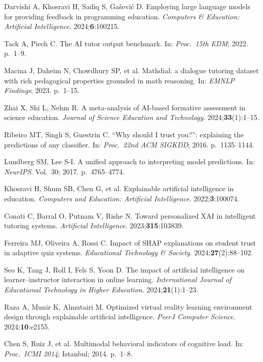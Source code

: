 \documentclass[ASNA,twocolumn]{USG} %
\begin{document}
\begin{thebibliography}{}
Darvishi A, Khosravi H, Sadiq S, Gašević D.
Employing large language models for providing
feedback in programming education.
\textit{Computers \& Education: Artificial Intelligence}.
2024;\textbf{6}:100215.

Tack A, Piech C.
The AI tutor output benchmark.
In: \textit{Proc.\ 15th EDM}; 2022. p.~1--9.

Macina J, Daheim N, Chowdhury SP, et al.
Mathdial: a dialogue tutoring dataset with rich
pedagogical properties grounded in math reasoning.
In: \textit{EMNLP Findings}; 2023. p.~1--15.

Zhai X, Shi L, Nehm R.
A meta-analysis of AI-based formative assessment
in science education.
\textit{Journal of Science Education and Technology}.
2024;\textbf{33}(1):1--15.

Ribeiro MT, Singh S, Guestrin C.
``Why should I trust you?'': explaining the predictions of any classifier.
In: \textit{Proc.\ 22nd ACM SIGKDD}; 2016. p.~1135--1144.

Lundberg SM, Lee S-I.
A unified approach to interpreting model predictions.
In: \textit{NeurIPS}. Vol.~30; 2017. p.~4765--4774.

Khosravi H, Shum SB, Chen G, et al.
Explainable artificial intelligence in education.
\textit{Computers and Education: Artificial Intelligence}.
2022;\textbf{3}:100074.

Conati C, Barral O, Putnam V, Rishe N.
Toward personalized XAI in intelligent tutoring systems.
\textit{Artificial Intelligence}.
2023;\textbf{315}:103839.

Ferreira MJ, Oliveira A, Rossi C.
Impact of SHAP explanations on student trust in
adaptive quiz systems.
\textit{Educational Technology \& Society}.
2024;\textbf{27}(2):88--102.

Seo K, Tang J, Roll I, Fels S, Yoon D.
The impact of artificial intelligence on learner--instructor
interaction in online learning.
\textit{International Journal of Educational Technology
in Higher Education}.
2024;\textbf{21}(1):1--23.

Raza A, Munir K, Almutairi M.
Optimized virtual reality learning environment design through explainable
artificial intelligence.
\textit{PeerJ Computer Science}.
2024;\textbf{10}:e2155.

Chen S, Ruiz J, et al.
Multimodal behavioral indicators of cognitive load.
In: \textit{Proc.\ ICMI 2014}; Istanbul; 2014. p.~1--8.


\end{thebibliography}
\end{document}
